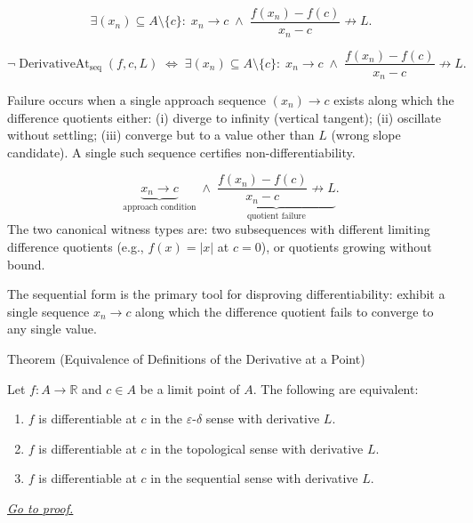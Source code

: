 \begin{remark*}
\[
\exists (x_n) \subseteq A \setminus \{c\}:\;
x_n \to c \;\land\; \frac{f(x_n)-f(c)}{x_n-c} \not\to L.
\]
\end{remark*}

\begin{remark*}
\[
\neg\operatorname{DerivativeAt}_{\mathrm{seq}}(f,c,L)
\;\Longleftrightarrow\;
\exists (x_n)\subseteq A\setminus\{c\}:\;
x_n\to c \;\land\; \frac{f(x_n)-f(c)}{x_n-c}\not\to L.
\]
\end{remark*}

\begin{remark*}
Failure occurs when a single approach sequence $(x_n) \to c$ exists along which the difference quotients either: (i) diverge to infinity (vertical tangent); (ii) oscillate without settling; (iii) converge but to a value other than $L$ (wrong slope candidate). A single such sequence certifies non-differentiability.
\end{remark*}

\begin{remark*}
\[
\underbrace{x_n \to c}_{\text{approach condition}} \;\land\; \underbrace{\frac{f(x_n)-f(c)}{x_n-c} \not\to L}_{\text{quotient failure}}.
\]
The two canonical witness types are: two subsequences with different limiting difference quotients (e.g., $f(x) = |x|$ at $c = 0$), or quotients growing without bound.
\end{remark*}

\begin{remark*}[Interpretation]
The sequential form is the primary tool for disproving differentiability: exhibit a single sequence $x_n \to c$ along which the difference quotient fails to converge to any single value.
\end{remark*}

\NoLocalDependencies


\begin{theorembox}{Theorem (Equivalence of Definitions of the Derivative at a Point)}
\begin{theorem}
\label{thm:derivative-equivalence}
Let $f : A \to \mathbb{R}$ and $c \in A$ be a limit point of $A$. The following are equivalent:
\begin{enumerate}
  \item $f$ is differentiable at $c$ in the $\varepsilon$-$\delta$ sense with derivative $L$.
  \item $f$ is differentiable at $c$ in the topological sense with derivative $L$.
  \item $f$ is differentiable at $c$ in the sequential sense with derivative $L$.
\end{enumerate}

\smallskip\noindent
\hyperref[prf:derivative-equivalence]{\textit{Go to proof.}}
\end{theorem}
\end{theorembox}

